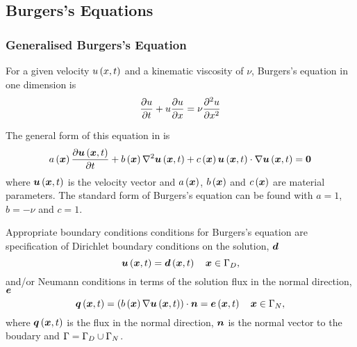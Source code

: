 \subsection{Burgers's Equations}

\subsubsection{Generalised Burgers's Equation}


For a given velocity $ u\left( x,t \right) $ and a kinematic viscosity of $\nu$, Burgers's equation
in one dimension is
\begin{equation}
   \dfrac{\partial u}{\partial t} +u \dfrac{\partial u}{\partial x} =\nu \dfrac{\partial^{2} u}{\partial {x}^{2}} 
  \label{eqn:Burgersequation}
\end{equation}

The general form of this equation in \OpenCMISS is
\begin{equation}
  \fnof{a}{\vect{x}}\delby{\fnof{\vect{u}}{\vect{x},t}}{t}+\fnof{b}{\vect{x}}\laplacian{\fnof{\vect{u}}{\vect{x},t}}+
  \fnof{c}{\vect{x}}\dotprod{\fnof{\vect{u}}{\vect{x},t}}{\gradient{}{\fnof{\vect{u}}{\vect{x},t}}}=\vect{0}
  \label{eqn:GeneralFormBurgersequation}
\end{equation}
where $\fnof{\vect{u}}{\vect{x},t}$ is the velocity vector and
$\fnof{a}{\vect{x}}$, $\fnof{b}{\vect{x}}$ and $\fnof{c}{\vect{x}}$ are
material parameters. The standard form of Burgers's equation can be found with
$a=1$, $b=-\nu$ and $c=1$.

Appropriate boundary conditions conditions for Burgers's
equation are specification of Dirichlet boundary conditions on the solution,
$\vect{d}$ \ie
\begin{equation}
  \fnof{\vect{u}}{\vect{x},t} = \fnof{\vect{d}}{\vect{x},t} \quad \vect{x}\in\Gamma_{D},
  \label{eqn:BurgersDirichletBC} 
\end{equation}
and/or Neumann conditions in terms of the solution flux in the normal
direction, $\vect{e}$ \ie
\begin{equation}
  \fnof{\vect{q}}{\vect{x},t} = \dotprod{\pbrac{\fnof{b}{\vect{x}}
      \gradient{}{\fnof{\vect{u}}{\vect{x},t}}}}{\normal} =
  \fnof{\vect{e}}{\vect{x},t} \quad \vect{x}\in\Gamma_{N},
  \label{eqn:BurgersNeumannBC} 
\end{equation}
where $\fnof{\vect{q}}{\vect{x},t}$ is the flux in the normal direction, $\boldsymbol{n}$ is the normal
vector to the boudary and $\Gamma=\Gamma_{D}\cup\Gamma_{N}$.

